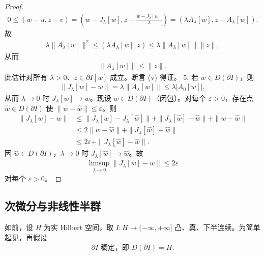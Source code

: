 \documentclass[../../main.tex]{subfiles}
\begin{document}
\begin{theorem}
\begin{proof}
\begin{align*}
0\leqslant(w-u,z-v)=\left(w-J_\lambda[w],z-\frac{w-J_\lambda[w]}\lambda\right)=(\lambda A_\lambda[w],z-A_\lambda[w]).
\end{align*}
故
\begin{align*}
\lambda\|A_\lambda[w]\|^2\leqslant(\lambda A_\lambda[w],z)\leqslant\lambda\|A_\lambda[w]\|\|z\|,
\end{align*}
从而
\begin{align*}
\|A_\lambda[w]\|\leqslant\|z\|.
\end{align*}
此估计对所有 $\lambda>0$、$z\in\partial I[w]$ 成立。断言 (v) 得证。
5. 若 $w\in D(\partial I)$，则
\begin{align*}
\|J_\lambda[w]-w\|=\lambda\|A_\lambda[w]\|\leqslant\lambda|A_0[w]|,
\end{align*}
从而 $\lambda\to 0$ 时 $J_\lambda[w]\to w$。现设 $w\in D(\partial I)$（闭包）。对每个 $\varepsilon>0$，存在点 $\widehat{w}\in D(\partial I)$ 使 $\|w-\widehat{w}\|\leqslant\varepsilon$。则
\begin{align*}
\|J_\lambda[w]-w\|&\leqslant\|J_\lambda[w]-J_\lambda[\widehat{w}]\|+\|J_\lambda[\widehat{w}]-\widehat{w}\|+\|w-\widehat{w}\|\\
&\leqslant 2\|w-\widehat{w}\|+\|J_\lambda[\widehat{w}]-\widehat{w}\|\\
&\leqslant 2\varepsilon+\|J_\lambda[\widehat{w}]-\widehat{w}\|.
\end{align*}
因 $\widehat{w}\in D(\partial I)$，$\lambda\to 0$ 时 $J_\lambda[\widehat{w}]\to\widehat{w}$。故
\begin{align*}
\limsup_{\lambda\to 0}\|J_\lambda[w]-w\|\leqslant 2\varepsilon
\end{align*}
对每个 $\varepsilon>0$。
\end{proof}
\end{theorem}

\subsection{次微分与非线性半群}\label{subsection:ch09-6-2-次微分非线性半群}

如前，设 $H$ 为实 Hilbert 空间，取 $I:H\to(-\infty,+\infty]$ 凸、真、下半连续。为简单起见，再假设
\begin{align}
\partial I\text{ 稠定，即 }D(\partial I)=H.\label{align:ch09-6-eq08}
\end{align}
\end{document}
